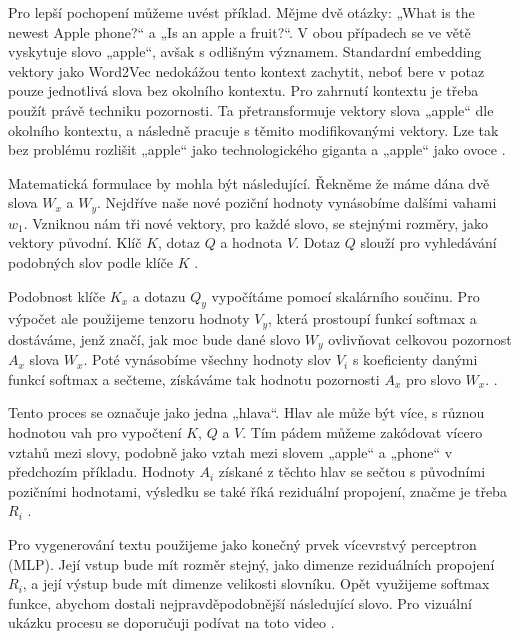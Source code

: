 \documentclass[FM,DP]{tulthesis}
\begin{document}
		Pro lepší pochopení můžeme uvést příklad. Mějme dvě otázky: „What is the newest Apple phone?“ a „Is an apple a fruit?“.  V obou případech se ve větě vyskytuje slovo „apple“, avšak s odlišným významem. Standardní embedding vektory jako Word2Vec nedokážou tento kontext zachytit, neboť bere v potaz pouze jednotlivá slova bez okolního kontextu. Pro zahrnutí kontextu je třeba použít právě techniku pozornosti. Ta přetransformuje vektory slova „apple“ dle okolního kontextu, a následně pracuje s těmito modifikovanými vektory. Lze tak bez problému rozlišit „apple“ jako technologického giganta a „apple“ jako ovoce \cite{vaswani2023attention}.
		
		Matematická formulace by mohla být následující. Řekněme že máme dána dvě slova $W_x$ a $W_y$. Nejdříve naše nové poziční hodnoty vynásobíme dalšími vahami $w_1$. Vzniknou nám tři nové vektory, pro každé slovo, se stejnými rozměry, jako vektory původní. Klíč $K$, dotaz $Q$ a hodnota $V$. Dotaz $Q$ slouží pro vyhledávání podobných slov podle klíče $K$ \cite{vaswani2023attention} \cite{rothman2021transformers}. 
		
		Podobnost klíče $K_x$ a dotazu $Q_y$ vypočítáme pomocí skalárního součinu. Pro výpočet ale použijeme tenzoru hodnoty $V_y$, která prostoupí funkcí softmax a dostáváme, jenž značí, jak moc bude dané slovo $W_y$ ovlivňovat celkovou pozornost $A_x$ slova $W_x$. Poté vynásobíme všechny hodnoty slov $V_i$ s koeficienty danými funkcí softmax a sečteme, získáváme tak hodnotu pozornosti $A_x$ pro slovo $W_x$. \cite{vaswani2023attention} \cite{rothman2021transformers}.
		
		Tento proces se označuje jako jedna „hlava“. Hlav ale může být více, s různou hodnotou vah pro vypočtení $K$, $Q$ a $V$. Tím pádem můžeme zakódovat vícero vztahů mezi slovy, podobně jako vztah mezi slovem „apple“ a „phone“ v předchozím příkladu. Hodnoty $A_i$ získané z těchto hlav se sečtou s původními pozičními hodnotami, výsledku se také říká reziduální propojení, značme je třeba $R_i$ \cite{vaswani2023attention} \cite{rothman2021transformers}.
		
		Pro vygenerování textu použijeme jako konečný prvek vícevrstvý perceptron (MLP). Její vstup bude mít rozměr stejný, jako dimenze reziduálních propojení $R_i$, a její výstup bude mít dimenze velikosti slovníku. Opět využijeme softmax funkce, abychom dostali nejpravděpodobnější následující slovo. Pro vizuální ukázku procesu se doporučuji podívat na toto video \cite{ytb:transformers} \cite{vaswani2023attention} \cite{rothman2021transformers}.
		
\end{document}
